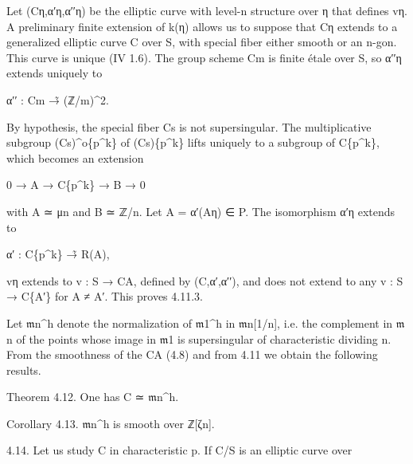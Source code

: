 \documentclass[11pt,a4paper]{article}
\begin{document}
Let (C\textunderscore{}η,α′\textunderscore{}η,α′′\textunderscore{}η) be the elliptic curve with level-n structure over η that defines v\textunderscore{}η. A preliminary finite extension of k(η) allows us to suppose that C\textunderscore{}η extends to a generalized elliptic curve C over S, with special fiber either smooth or an n-gon. This curve is unique (IV 1.6). The group scheme C\textunderscore{}m is finite étale over S, so α′′\textunderscore{}η extends uniquely to

α′′ : C\textunderscore{}m →̃ (ℤ/m)\textasciicircum{}2.

By hypothesis, the special fiber C\textunderscore{}s is not supersingular. The multiplicative subgroup (C\textunderscore{}s)\textasciicircum{}o\textunderscore{}\{p\textasciicircum{}k\} of (C\textunderscore{}s)\textunderscore{}\{p\textasciicircum{}k\} lifts uniquely to a subgroup of C\textunderscore{}\{p\textasciicircum{}k\}, which becomes an extension

0 → A → C\textunderscore{}\{p\textasciicircum{}k\} → B → 0

with A ≃ μ\textunderscore{}n and B ≃ ℤ/n. Let A = α′(A\textunderscore{}η) ∈ P. The isomorphism α′\textunderscore{}η extends to

α′ : C\textunderscore{}\{p\textasciicircum{}k\} →̃ R(A),

v\textunderscore{}η extends to v : S → C\textunderscore{}A, defined by (C,α′,α′′), and does not extend to any v : S → C\textunderscore{}\{A′\} for A ≠ A′. This proves 4.11.3.

Let \ensuremath{\mathfrak{m}}\textunderscore{}n\textasciicircum{}h denote the normalization of \ensuremath{\mathfrak{m}}\textunderscore{}1\textasciicircum{}h in \ensuremath{\mathfrak{m}}\textunderscore{}n[1/n], i.e. the complement in \ensuremath{\mathfrak{m}}\textunderscore{}n of the points whose image in \ensuremath{\mathfrak{m}}\textunderscore{}1 is supersingular of characteristic dividing n. From the smoothness of the C\textunderscore{}A (4.8) and from 4.11 we obtain the following results.

Theorem 4.12. One has C ≃ \ensuremath{\mathfrak{m}}\textunderscore{}n\textasciicircum{}h.

Corollary 4.13. \ensuremath{\mathfrak{m}}\textunderscore{}n\textasciicircum{}h is smooth over ℤ[ζ\textunderscore{}n].

4.14. Let us study C in characteristic p. If C/S is an elliptic curve over
\end{document}
